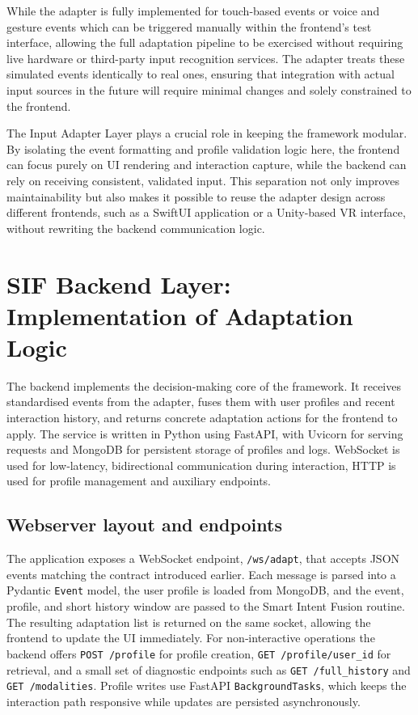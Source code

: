 \documentclass[openany]{book}
\begin{document}
While the adapter is fully implemented for touch-based events or voice and gesture events which can be triggered manually within the frontend’s test interface, allowing the full adaptation pipeline to be exercised without requiring live hardware or third-party input recognition services. The adapter treats these simulated events identically to real ones, ensuring that integration with actual input sources in the future will require minimal changes and solely constrained to the frontend.

The Input Adapter Layer plays a crucial role in keeping the framework modular. By isolating the event formatting and profile validation logic here, the frontend can focus purely on UI rendering and interaction capture, while the backend can rely on receiving consistent, validated input. This separation not only improves maintainability but also makes it possible to reuse the adapter design across different frontends, such as a SwiftUI application or a Unity-based VR interface, without rewriting the backend communication logic.

\section{SIF Backend Layer: Implementation of Adaptation Logic}
The backend implements the decision‑making core of the framework. It receives standardised events from the adapter, fuses them with user profiles and recent interaction history, and returns concrete adaptation actions for the frontend to apply. The service is written in Python using FastAPI, with Uvicorn for serving requests and MongoDB for persistent storage of profiles and logs. WebSocket is used for low‑latency, bidirectional communication during interaction, HTTP is used for profile management and auxiliary endpoints.

\subsection{Webserver layout and endpoints}
The application exposes a WebSocket endpoint, \texttt{/ws/adapt}, that accepts JSON events matching the contract introduced earlier. Each message is parsed into a Pydantic \texttt{Event} model, the user profile is loaded from MongoDB, and the event, profile, and short history window are passed to the Smart Intent Fusion routine. The resulting adaptation list is returned on the same socket, allowing the frontend to update the UI immediately. For non‑interactive operations the backend offers \texttt{POST /profile} for profile creation, \texttt{GET /profile/{user\_id}} for retrieval, and a small set of diagnostic endpoints such as \texttt{GET /full\_history} and \texttt{GET /modalities}. Profile writes use FastAPI \texttt{BackgroundTasks}, which keeps the interaction path responsive while updates are persisted asynchronously.
\end{document}
